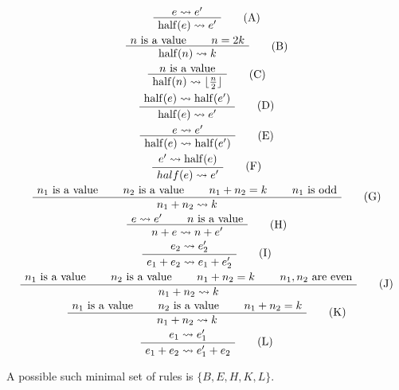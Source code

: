 \begin{exercise}{}
  
    \allowdisplaybreaks
    \addtolength{\jot}{2ex}
    \begin{gather*}
      \AxiomC{\(e \leadsto e'\)}
      \UnaryInfC{\(\half(e) \leadsto e'\)}
      \DisplayProof \tag{A} \\
      \AxiomC{\(n\) is a value}
      \AxiomC{\(n = 2k\)}
      \BinaryInfC{\(\half(n) \leadsto k\)}
      \DisplayProof \tag{B} \\
      \AxiomC{\(n\) is a value}
      \UnaryInfC{\(\half(n) \leadsto \lfloor \frac{n}{2} \rfloor\)}
      \DisplayProof \tag{C} \\
      \AxiomC{\(\half(e) \leadsto \half(e')\)}
      \UnaryInfC{\(\half(e) \leadsto e'\)}
      \DisplayProof \tag{D} \\
      \AxiomC{\(e \leadsto e'\)}
      \UnaryInfC{\(\half(e) \leadsto \half(e')\)}
      \DisplayProof \tag{E} \\
      \AxiomC{\(e' \leadsto \half(e)\)}
      \UnaryInfC{\(half(e) \leadsto e'\)}
      \DisplayProof \tag{F} \\
      \AxiomC{\(n_1\) is a value}
      \AxiomC{\(n_2\) is a value}
      \AxiomC{\(n_1 + n_2 = k\)}
      \AxiomC{\(n_1\) is odd}
      \QuaternaryInfC{\(n_1 + n_2 \leadsto k\)}
      \DisplayProof \tag{G} \\
      \AxiomC{\(e \leadsto e'\)}
      \AxiomC{\(n\) is a value}
      \BinaryInfC{\(n + e \leadsto n + e'\)}
      \DisplayProof \tag{H} \\
      \AxiomC{\(e_2 \leadsto e_2'\)}
      \UnaryInfC{\(e_1 + e_2 \leadsto e_1 + e_2'\)}
      \DisplayProof \tag{I} \\
      \AxiomC{\(n_1\) is a value}
      \AxiomC{\(n_2\) is a value}
      \AxiomC{\(n_1 + n_2 = k\)}
      \AxiomC{\(n_1, n_2\) are even}
      \QuaternaryInfC{\(n_1 + n_2 \leadsto k\)}
      \DisplayProof \tag{J} \\
      \AxiomC{\(n_1\) is a value}
      \AxiomC{\(n_2\) is a value}
      \AxiomC{\(n_1 + n_2 = k\)}
      \TrinaryInfC{\(n_1 + n_2 \leadsto k\)}
      \DisplayProof \tag{K} \\
      \AxiomC{\(e_1 \leadsto e_1'\)}
      \UnaryInfC{\(e_1 + e_2 \leadsto e_1' + e_2\)}
      \DisplayProof \tag{L} 
    \end{gather*}

  \begin{solution}
    A possible such minimal set of rules is \(\{B, E, H, K, L\}\). %


\end{solution}
\end{exercise}
